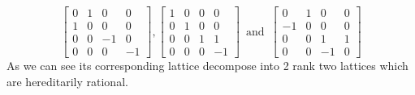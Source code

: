 \documentclass{article}
\theoremstyle{plain}
\theoremstyle{definition}
\newcommand{\tand}{\ensuremath{\,\,\, \text{and} \,\,\,}}
\begin{document}
$$
 \left[ \begin {array}{cccc} 0&1&0&0\\ 1&0&0&0
\\ 0&0&-1&0\\ 0&0&0&-1\end {array}
 \right], 
 \left[ \begin {array}{cccc} 1&0&0&0\\ 0&1&0&0
\\ 0&0&1&1\\ 0&0&0&-1\end {array}
 \right] 
 \tand
 \left[ \begin {array}{cccc} 0&1&0&0\\ -1&0&0&0
\\ 0&0&1&1\\ 0&0&-1&0\end {array}
 \right] 
$$
As we can see its corresponding lattice decompose into 2 rank two lattices which are hereditarily rational.
\end{document}
